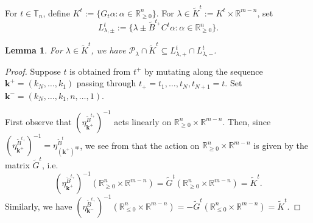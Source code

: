 \documentclass{amsart}
\newtheorem{lemma}[theorem]{Lemma}
\numberwithin{theorem}{section}
\newcommand{\bfk}{{\boldsymbol{k}}}
\newcommand{\cP}{\mathcal{P}}
\newcommand{\RR}{\mathbb{R}}
\newcommand{\TT}{\mathbb{T}}
\begin{document}
  For $t\in\TT_n$, define $K^t:=\{G_t\alpha:\alpha\in\RR_{\ge0}^n\}$.
  For $\lambda \in \widetilde K^t := K^t \times \RR^{m-n}$, set 
  \[L^t_{\lambda,\pm}:=\{\lambda \pm \widetilde B^{t_+} C^t\alpha:\alpha\in\RR_{\ge0}^n\}.\]
  \begin{lemma}
    For $\lambda\in \widetilde K^t$, we have $\cP_\lambda\cap \widetilde K^t\subseteq L^t_{\lambda,+}\cap L^t_{\lambda,-}$.
  \end{lemma}
  \begin{proof}
    Suppose $t$ is obtained from $t^+$ by mutating along the sequence $\bfk^+=(k_N,\ldots,k_1)$ passing through $t_+=t_1,\ldots,t_N,t_{N+1}=t$.
    Set $\bfk^-=(k_N,\ldots,k_1,n,\ldots,1)$.

    First observe that $\left(\eta^{\widetilde B^{t_+}}_{\bfk^+}\right)^{-1}$ acts linearly on $\RR_{\ge0}^n\times \RR^{m-n}$.
    Then, since $\left(\eta^{\widetilde B^{t_+}}_{\bfk^+}\right)^{-1}=\eta^{\widetilde B^t}_{(\bfk^+)^{op}}$, we see from \cite[Equation (1.13)]{nakanishi-zelevinsky} that the action on $\RR_{\ge0}^n\times \RR^{m-n}$ is given by the matrix $\widetilde G^t$, i.e. 
    \[\left(\eta^{\widetilde B^{t_+}}_{\bfk^+}\right)^{-1}(\RR_{\ge0}^n\times \RR^{m-n})=\widetilde G^t(\RR_{\ge0}^n\times \RR^{m-n})=\widetilde K^t.\]
    Similarly, we have $\left(\eta^{\widetilde B^{t_+}}_{\bfk^-}\right)^{-1}(\RR_{\le0}^n\times \RR^{m-n})=-\widetilde G^t(\RR_{\le0}^n\times \RR^{m-n})=\widetilde K^t$.


\end{proof}
\end{document}
